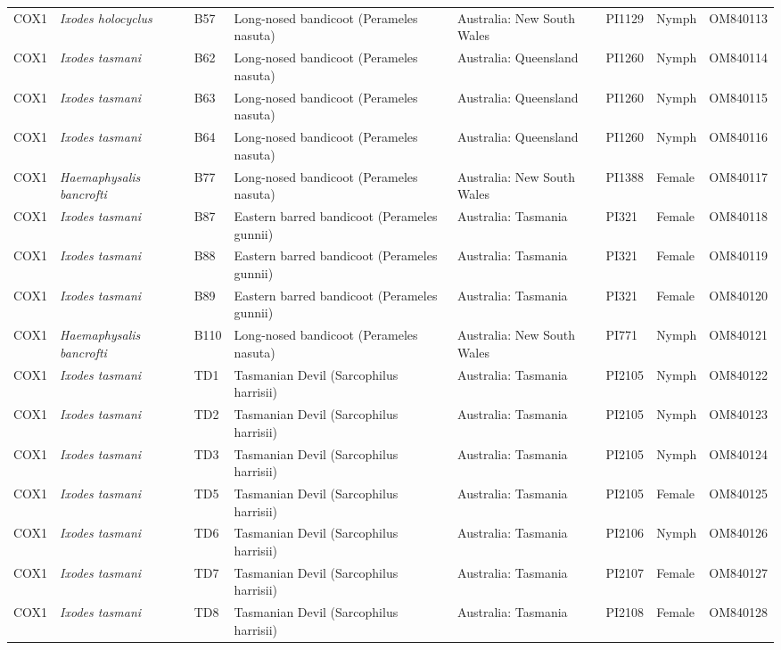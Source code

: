 \documentclass[a4paper, nobind]{templates/ociamthesis}
\begin{document}
\begin{landscape}
\begin{longtable}[t]{l>{}lllllll}
COX1 & \em{Ixodes holocyclus} & B57 & Long-nosed bandicoot (Perameles nasuta) & Australia: New South Wales & PI1129 & Nymph & OM840113\\
COX1 & \em{Ixodes tasmani} & B62 & Long-nosed bandicoot (Perameles nasuta) & Australia: Queensland & PI1260 & Nymph & OM840114\\
COX1 & \em{Ixodes tasmani} & B63 & Long-nosed bandicoot (Perameles nasuta) & Australia: Queensland & PI1260 & Nymph & OM840115\\
COX1 & \em{Ixodes tasmani} & B64 & Long-nosed bandicoot (Perameles nasuta) & Australia: Queensland & PI1260 & Nymph & OM840116\\
COX1 & \em{Haemaphysalis bancrofti} & B77 & Long-nosed bandicoot (Perameles nasuta) & Australia: New South Wales & PI1388 & Female & OM840117\\
COX1 & \em{Ixodes tasmani} & B87 & Eastern barred bandicoot (Perameles gunnii) & Australia: Tasmania & PI321 & Female & OM840118\\
COX1 & \em{Ixodes tasmani} & B88 & Eastern barred bandicoot (Perameles gunnii) & Australia: Tasmania & PI321 & Female & OM840119\\
COX1 & \em{Ixodes tasmani} & B89 & Eastern barred bandicoot (Perameles gunnii) & Australia: Tasmania & PI321 & Female & OM840120\\
COX1 & \em{Haemaphysalis bancrofti} & B110 & Long-nosed bandicoot (Perameles nasuta) & Australia: New South Wales & PI771 & Nymph & OM840121\\
COX1 & \em{Ixodes tasmani} & TD1 & Tasmanian Devil (Sarcophilus harrisii) & Australia: Tasmania & PI2105 & Nymph & OM840122\\
COX1 & \em{Ixodes tasmani} & TD2 & Tasmanian Devil (Sarcophilus harrisii) & Australia: Tasmania & PI2105 & Nymph & OM840123\\
COX1 & \em{Ixodes tasmani} & TD3 & Tasmanian Devil (Sarcophilus harrisii) & Australia: Tasmania & PI2105 & Nymph & OM840124\\
COX1 & \em{Ixodes tasmani} & TD5 & Tasmanian Devil (Sarcophilus harrisii) & Australia: Tasmania & PI2105 & Female & OM840125\\
COX1 & \em{Ixodes tasmani} & TD6 & Tasmanian Devil (Sarcophilus harrisii) & Australia: Tasmania & PI2106 & Nymph & OM840126\\
COX1 & \em{Ixodes tasmani} & TD7 & Tasmanian Devil (Sarcophilus harrisii) & Australia: Tasmania & PI2107 & Female & OM840127\\
COX1 & \em{Ixodes tasmani} & TD8 & Tasmanian Devil (Sarcophilus harrisii) & Australia: Tasmania & PI2108 & Female & OM840128\\

\end{longtable}
\end{landscape}
\end{document}
